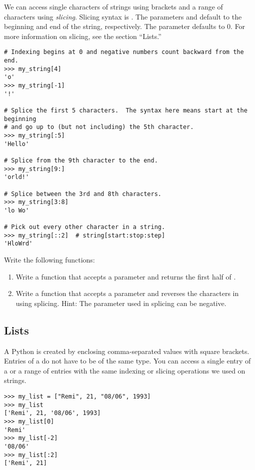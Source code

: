 We can access single characters of strings using brackets and a range of characters using \emph{slicing}. Slicing syntax is . The parameters  and  default to the beginning and end of the string, respectively. The parameter  defaults to 0. For more information on slicing, see the section ``Lists.''

\begin{lstlisting}
# Indexing begins at 0 and negative numbers count backward from the end.
>>> my_string[4]
'o'
>>> my_string[-1]
'!'

# Splice the first 5 characters.  The syntax here means start at the beginning
# and go up to (but not including) the 5th character.
>>> my_string[:5]
'Hello'

# Splice from the 9th character to the end.
>>> my_string[9:]
'orld!'

# Splice between the 3rd and 8th characters.
>>> my_string[3:8]
'lo Wo'

# Pick out every other character in a string.
>>> my_string[::2]	# string[start:stop:step]
'HloWrd'
\end{lstlisting}


\begin{problem}
Write the following functions:
\begin{enumerate}
\item Write a function  that accepts a parameter  and returns the first half of .
\item Write a function  that accepts a parameter  and reverses the characters in  using splicing.  Hint: The  parameter used in splicing can be negative.
\end{enumerate}
\end{problem}


\subsection*{Lists}
A Python  is created by enclosing comma-separated values with square brackets. Entries of a  do not have to be of the same type. You can access a single entry of a  or a range of entries with the same indexing or slicing operations we used on strings. 
\begin{lstlisting}
>>> my_list = ["Remi", 21, "08/06", 1993]
>>> my_list
['Remi', 21, '08/06', 1993]
>>> my_list[0]
'Remi'
>>> my_list[-2]
'08/06'
>>> my_list[:2]
['Remi', 21]
\end{lstlisting}

